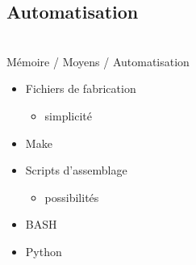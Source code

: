 \subsection{Automatisation}\begin{frame}
{\bititle\\Mémoire / Moyens / Automatisation}
\begin{multicols}{2}
\begin{itemize}
\item<1-> Fichiers de fabrication\begin{itemize}
    \item<2-> simplicité
    \end{itemize}
\columnbreak
\item<3-> Make
\end{itemize}
\end{multicols}\begin{multicols}{2}
\begin{itemize}
\item<4-> Scripts d’assemblage\begin{itemize}
    \item<5-> possibilités
    \end{itemize}
\end{itemize}
\columnbreak
\begin{itemize}
\item<6-> BASH
\item<6-> Python
\end{itemize}
\end{multicols}\end{frame}
